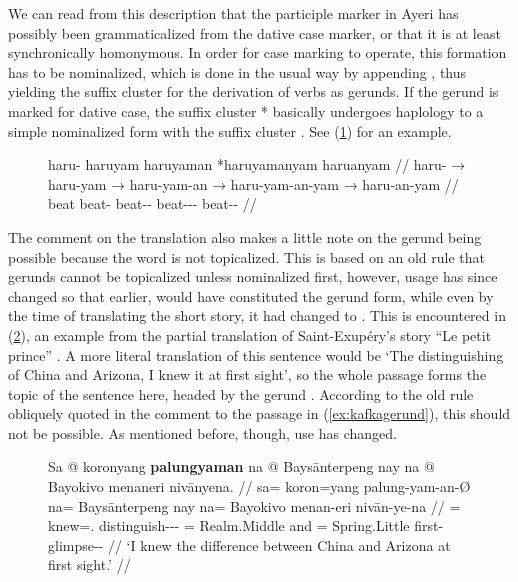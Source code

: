 We can read from this description that the participle marker in Ayeri has
possibly been grammaticalized from the dative case marker, or that it is at
least synchronically homonymous. In order for case marking to operate, this
formation has to be nominalized, which is done in the usual way by appending
, thus yielding the suffix cluster  for the
derivation of verbs as gerunds. If the gerund is marked for dative case, the
suffix cluster * basically undergoes haplology to a
simple nominalized form with the suffix cluster . See
(\ref{ex:datnmlz}) for an example.

\begin{figure}[h]
\ex\label{ex:datnmlz}%
\begingl
	\gla haru- {} haruyam {} haruyaman {} *haruyamanyam {} haruanyam //
	\glb haru- → haru-yam → haru-yam-an → haru-yam-an-yam → 
		haru-an-yam //
	\glc beat {} beat-\Ptcp{} {} beat-\Ptcp{}-\Nmlz{} {} 
		beat-\Ptcp{}-\Nmlz{}-\Dat{} {} beat-\Nmlz{}-\Dat{} //
\endgl\xe
\end{figure}

The comment on the translation also makes a little note on the gerund being
possible because the word is not topicalized. This is based on an old rule that
gerunds cannot be topicalized unless nominalized first, however, usage has
since changed so that earlier,  would have constituted
the gerund form, while even by the time of translating the short story, it had
changed to . This is encountered in
(\ref{ex:exuperygerund}), an example from the partial translation of
Saint-Exupéry's story \enquote{Le petit prince} \citep[3, 13]
{benung:petitprince}. A more literal translation of this sentence would be `The
distinguishing of China and Arizona, I knew it at first sight', so the whole
passage  forms the topic
of the sentence here, headed by the gerund
. According to the old rule
obliquely quoted in the comment to the passage in (\ref{ex:kafkagerund}), this
should not be possible. As mentioned before, though, use has changed.

\begin{figure}[h]
\ex\label{ex:exuperygerund}\begingl
	\gla Sa @ koronyang \textbf{palungyaman} na @ Baysānterpeng nay na @
		Bayokivo menaneri nivānyena. //
	\glb sa= koron=yang palung-yam-an-Ø na= Baysānterpeng nay na= 
		Bayokivo menan-eri nivān-ye-na //
	\glc \PatT{}= knew=\Fsg{}.\Aarg{} distinguish-\Ptcp{}-\Nmlz{}-\Top{} 
		\Gen{}= Realm.Middle and \Gen{}= Spring.Little first-\Ins{} 
		glimpse-\Pl{}-\Gen{} //
	\glft `I knew the difference between China and Arizona at first sight.' //
\endgl\xe
\end{figure}

